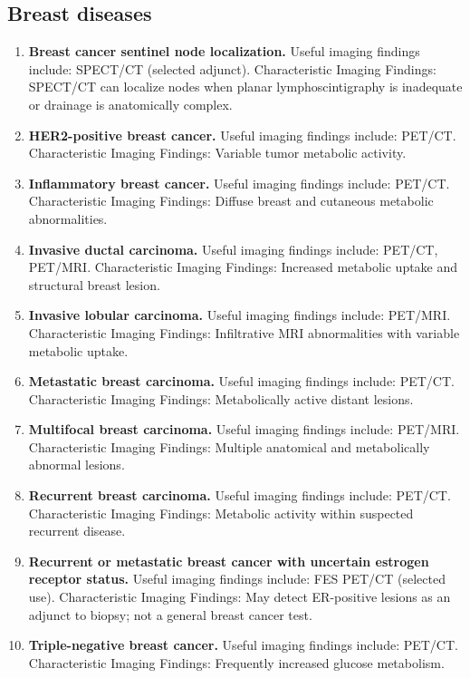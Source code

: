 \subsection{Breast diseases}
\begin{enumerate}[leftmargin=*,itemsep=0.45em,topsep=0.4em]
\item \textbf{Breast cancer sentinel node localization.} Useful imaging findings include: SPECT/CT (selected adjunct). Characteristic Imaging Findings: SPECT/CT can localize nodes when planar lymphoscintigraphy is inadequate or drainage is anatomically complex.
\item \textbf{HER2-positive breast cancer.} Useful imaging findings include: PET/CT. Characteristic Imaging Findings: Variable tumor metabolic activity.
\item \textbf{Inflammatory breast cancer.} Useful imaging findings include: PET/CT. Characteristic Imaging Findings: Diffuse breast and cutaneous metabolic abnormalities.
\item \textbf{Invasive ductal carcinoma.} Useful imaging findings include: PET/CT, PET/MRI. Characteristic Imaging Findings: Increased metabolic uptake and structural breast lesion.
\item \textbf{Invasive lobular carcinoma.} Useful imaging findings include: PET/MRI. Characteristic Imaging Findings: Infiltrative MRI abnormalities with variable metabolic uptake.
\item \textbf{Metastatic breast carcinoma.} Useful imaging findings include: PET/CT. Characteristic Imaging Findings: Metabolically active distant lesions.
\item \textbf{Multifocal breast carcinoma.} Useful imaging findings include: PET/MRI. Characteristic Imaging Findings: Multiple anatomical and metabolically abnormal lesions.
\item \textbf{Recurrent breast carcinoma.} Useful imaging findings include: PET/CT. Characteristic Imaging Findings: Metabolic activity within suspected recurrent disease.
\item \textbf{Recurrent or metastatic breast cancer with uncertain estrogen receptor status.} Useful imaging findings include: FES PET/CT (selected use). Characteristic Imaging Findings: May detect ER-positive lesions as an adjunct to biopsy; not a general breast cancer test.
\item \textbf{Triple-negative breast cancer.} Useful imaging findings include: PET/CT. Characteristic Imaging Findings: Frequently increased glucose metabolism.
\end{enumerate}

